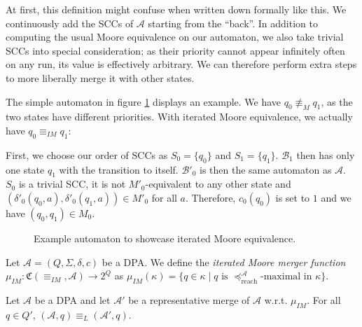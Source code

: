 At first, this definition might confuse when written down formally like this. We continuously add the SCCs of $\mathcal{A}$ starting from the \enquote{back}. In addition to computing the usual Moore equivalence on our automaton, we also take trivial SCCs into special consideration; as their priority cannot appear infinitely often on any run, its value is effectively arbitrary. We can therefore perform extra steps to more liberally merge it with other states.

The simple automaton in figure \ref{fig:fritzwilke:example} displays an example. We have $q_0 \not\equiv_M q_1$, as the two states have different priorities. With iterated Moore equivalence, we actually have $q_0 \equiv_{IM} q_1$:

First, we choose our order of SCCs as $S_0 = \{q_0\}$ and $S_1 = \{q_1\}$. $\mathcal{B}_1$ then has only one state $q_1$ with the transition to itself. $\mathcal{B}'_0$ is then the same automaton as $\mathcal{A}$. $S_0$ is a trivial SCC, it is not $M'_0$-equivalent to any other state and $(\delta'_0(q_0, a), \delta'_0(q_1, a)) \in M'_0$ for all $a$. Therefore, $c_0(q_0)$ is set to $1$ and we have $(q_0, q_1) \in M_0$.

\begin{figure}
\centering
{}
\caption{Example automaton to showcase iterated Moore equivalence.}
\label{fig:fritzwilke:example}
\end{figure}

\begin{defn}
	Let $\mathcal{A} = (Q, \Sigma, \delta, c)$ be a DPA. We define the \emph{iterated Moore merger function} $\mu_{IM} : \mathfrak{C}(\equiv_{IM}, \mathcal{A}) \rightarrow 2^Q$ as $\mu_{IM}(\kappa) = \{ q \in \kappa \mid q \text{ is } \preceq_\text{reach}^\mathcal{A} \text{-maximal in } \kappa \}$.
\end{defn}

\begin{theorem}
	Let $\mathcal{A}$ be a DPA and let $\mathcal{A}'$ be a representative merge of $\mathcal{A}$ w.r.t. $\mu_{IM}$. For all $q \in Q'$, $(\mathcal{A}, q) \equiv_L (\mathcal{A}', q)$.
\end{theorem}

